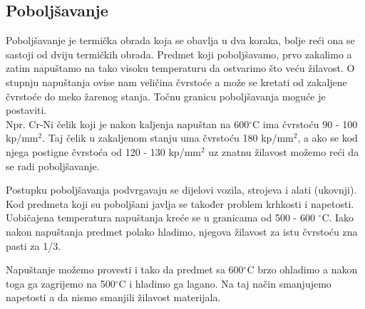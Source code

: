 \documentclass[a4paper,12pt]{article}
\numberwithin{figure}{section}
\begin{document}
\subsection{Poboljšavanje}
Poboljšavanje je termička obrada koja se obavlja u dva koraka, bolje reći ona se sastoji od dviju termičkih obrada. Predmet koji poboljšavamo, prvo zakalimo a zatim napuštamo na tako visoku temperaturu da ostvarimo što veću žilavost. O stupnju napuštanja ovise nam veličina čvrstoće a može se kretati od zakaljene čvrstoće do meko žarenog stanja. Točnu granicu poboljšavanja moguće je postaviti.\\
Npr. Cr-Ni čelik koji je nakon kaljenja napuštan na 600$^{\circ}$C ima čvrstoću 90 - 100 kp/mm$^{2}$. Taj čelik u zakaljenom stanju uma čvrstoću 180 kp/mm$^{2}$, a ako se kod njega postigne čvrstoća od 120 - 130 kp/mm$^{2}$ uz znatnu žilavost možemo reći da se radi poboljšavanje. \par
Postupku poboljšavanja podvrgavaju se dijelovi vozila, strojeva i alati (ukovnji). Kod predmeta koji su poboljšani javlja se također problem krhkosti i napetosti. Uobičajena temperatura napuštanja kreće se u granicama od 500 - 600 $^{\circ}$C. Iako nakon napuštanja predmet polako hladimo, njegova žilavost za istu čvrstoću zna pasti za 1/3.\par
Napuštanje možemo provesti i tako da predmet sa 600$^{\circ}$C brzo ohladimo a nakon toga ga zagrijemo na 500$^{\circ}$C i hladimo ga lagano. Na taj način smanjujemo napetosti a da nismo smanjili žilavost materijala.
\end{document}
